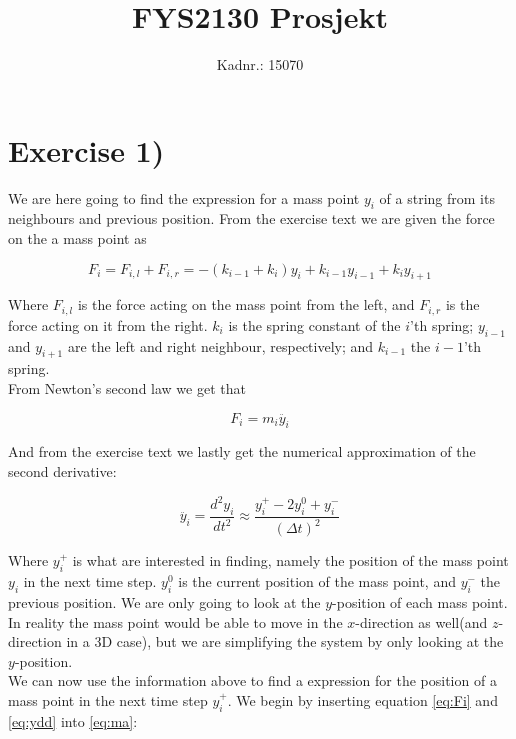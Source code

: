 \documentclass[a4paper,norsk, 10pt]{article}
\title{FYS2130 Prosjekt}
\author{Kadnr.: 15070}
\begin{document}
\maketitle
\newpage

\section{Exercise 1)}

We are here going to find the expression for a mass point $y_i$ of a string from its neighbours and previous position. From the exercise text we are given the force on the a mass point as

\begin{equation}
F_i = F_{i,l} + F_{i,r} = -(k_{i-1} + k_i)y_i + k_{i-1}y_{i-1} + k_iy_{i+1}
\label{eq:Fi}
\end{equation}

Where $F_{i,l}$ is the force acting on the mass point from the left, and $F_{i,r}$ is the force acting on it from the right. $k_i$ is the spring constant of the $i$'th spring; $y_{i-1}$ and $y_{i+1}$ are the left and right neighbour, respectively; and $k_{i-1}$ the $i-1$'th spring.\\

From Newton's second law we get that

\begin{equation}
F_i = m_i\ddot{y_i}
\label{eq:ma}
\end{equation}

And from the exercise text we lastly get the numerical approximation of the second derivative:

\begin{equation}
\ddot{y_i} = \frac{d^2y_i}{dt^2} \approx \frac{y_i^+ -2y_i^0 + y_i^-}{(\Delta t)^2}
\label{eq:ydd}
\end{equation}

Where $y_i^+$ is what are interested in finding, namely the position of the mass point $y_i$ in the next time step. $y_i^0$ is the current position of the mass point, and $y_i^-$ the previous position. We are only going to look at the $y$-position of each mass point. In reality the mass point would be able to move in the $x$-direction as well(and $z$-direction in a 3D case), but we are simplifying the system by only looking at the $y$-position. \\

We can now use the information above to find a expression for the position of a mass point in the next time step $y_i^+$. We begin by inserting equation \eqref{eq:Fi} and \eqref{eq:ydd} into \eqref{eq:ma}:
\end{document}
